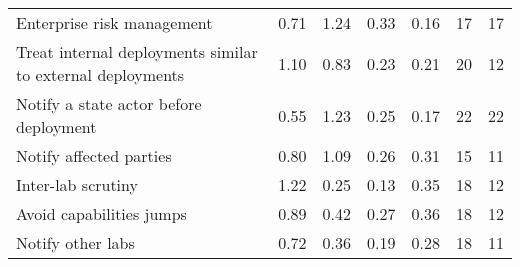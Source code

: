 \documentclass{article}
\begin{document}
\begin{sidewaystable}
\begin{tabular}{l*{6}{r}}
Enterprise risk management & 0.71 & 1.24 & 0.33 & 0.16 & 17 & 17 \\
Treat internal deployments similar to external deployments & 1.10 & 0.83 & 0.23 & 0.21 & 20 & 12 \\
Notify a state actor before deployment & 0.55 & 1.23 & 0.25 & 0.17 & 22 & 22 \\
Notify affected parties & 0.80 & 1.09 & 0.26 & 0.31 & 15 & 11 \\
Inter-lab scrutiny & 1.22 & 0.25 & 0.13 & 0.35 & 18 & 12 \\
Avoid capabilities jumps & 0.89 & 0.42 & 0.27 & 0.36 & 18 & 12 \\
Notify other labs & 0.72 & 0.36 & 0.19 & 0.28 & 18 & 11 \\
        \bottomrule
    \end{tabular}
\end{sidewaystable}
\end{document}
